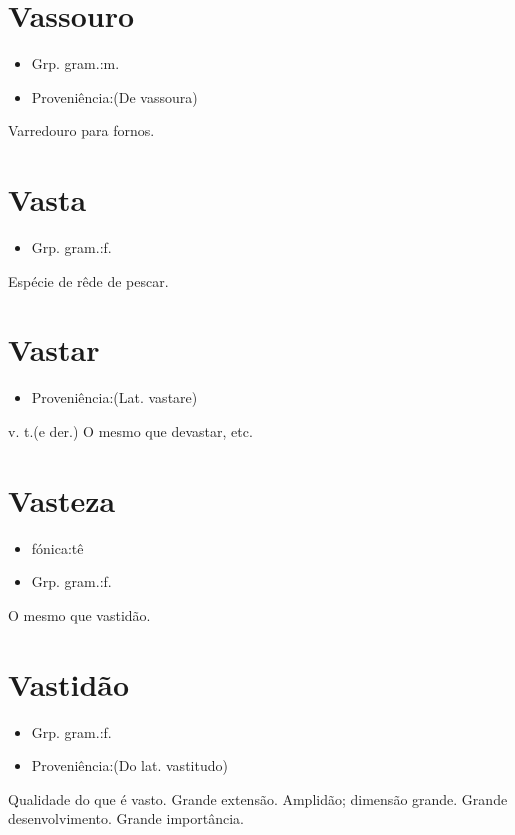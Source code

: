 \documentclass{article}
\begin{document}
\section{Vassouro}
\begin{itemize}
\item {Grp. gram.:m.}
\end{itemize}
\begin{itemize}
\item {Proveniência:(De \textunderscore vassoura\textunderscore )}
\end{itemize}
Varredouro para fornos.
\section{Vasta}
\begin{itemize}
\item {Grp. gram.:f.}
\end{itemize}
Espécie de rêde de pescar.
\section{Vastar}
\begin{itemize}
\item {Proveniência:(Lat. \textunderscore vastare\textunderscore )}
\end{itemize}
\textunderscore v. t.\textunderscore  (e der.)
O mesmo que \textunderscore devastar\textunderscore , etc.
\section{Vasteza}
\begin{itemize}
\item {fónica:tê}
\end{itemize}
\begin{itemize}
\item {Grp. gram.:f.}
\end{itemize}
O mesmo que \textunderscore vastidão\textunderscore .
\section{Vastidão}
\begin{itemize}
\item {Grp. gram.:f.}
\end{itemize}
\begin{itemize}
\item {Proveniência:(Do lat. \textunderscore vastitudo\textunderscore )}
\end{itemize}
Qualidade do que é vasto.
Grande extensão.
Amplidão; dimensão grande.
Grande desenvolvimento.
Grande importância.
\end{document}
